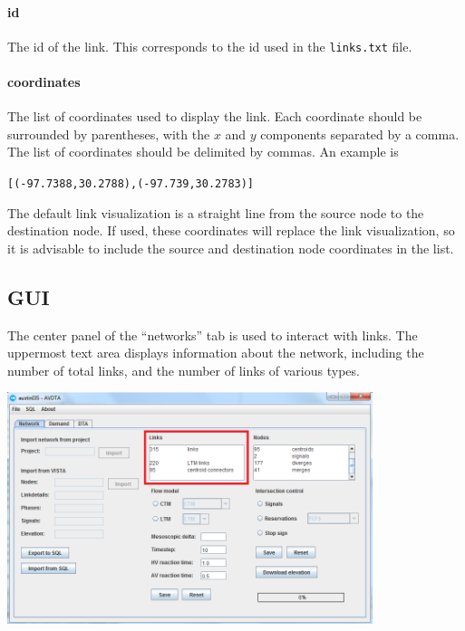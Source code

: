 \paragraph*{id} The id of the link. This corresponds to the id used in the \texttt{links.txt} file.
\paragraph*{coordinates} The list of coordinates used to display the link. Each coordinate should be surrounded by parentheses, with the $x$ and $y$ components separated by a comma. The list of coordinates should be delimited by commas. An example is
\begin{center}
\texttt{[(-97.7388,30.2788),(-97.739,30.2783)]}
\end{center} 
The default link visualization is a straight line from the source node to the destination node. If used, these coordinates will replace the link visualization, so it is advisable to include the source and destination node coordinates in the list.



\subsection{GUI}

The center panel of the ``networks'' tab is used to interact with links. The uppermost text area displays information about the network, including the number of total links, and the number of links of various types.
\begin{center}
\includegraphics[width=0.8\textwidth]{images/links1.png}
\end{center}

